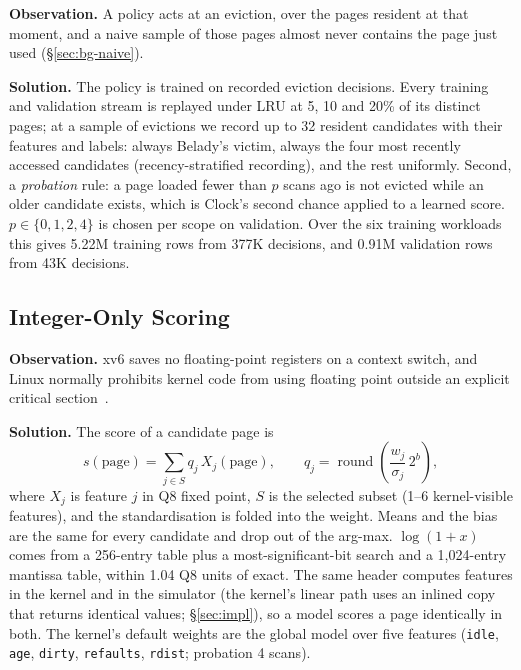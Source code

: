 \documentclass{article}
\newcommand{\clock}{Clock\xspace}
\newcommand{\belady}{Belady\xspace}
\newcommand{\feat}[1]{\texttt{#1}}         %
\newcommand{\finding}[1]{\textbf{#1}\hspace{0.4em}}
\begin{document}
\finding{Observation.} A policy acts at an eviction, over the pages resident at that
moment, and a naive sample of those pages almost never contains the page just used
(\S\ref{sec:bg-naive}).

\finding{Solution.} The policy is trained on recorded eviction decisions. Every training and
validation stream is replayed under LRU at 5, 10 and 20\% of its distinct pages; at a
sample of evictions we record up to 32 resident candidates with their features and
labels: always \belady's victim, always the four most recently accessed candidates
(recency-stratified recording), and the rest uniformly. Second, a \emph{probation} rule: a page loaded
fewer than $p$ scans ago is not evicted while an older candidate exists, which is
\clock's second chance applied to a learned score. $p\in\{0,1,2,4\}$ is chosen per
scope on validation. Over the six training workloads this gives 5.22M training rows
from 377K decisions, and 0.91M validation rows from 43K decisions.

\subsection{Integer-Only Scoring}
\label{sec:design-int}

\finding{Observation.} xv6 saves no floating-point registers on a context switch, and
Linux normally prohibits kernel code from using floating point outside an explicit
critical section~\citep{linux_fpu}.

\finding{Solution.} The score of a candidate page is
\begin{equation}
s(\text{page}) = \sum_{j\in S} q_j\, X_j(\text{page}), \qquad
q_j = \operatorname{round}\!\left(\frac{w_j}{\sigma_j}\, 2^{b}\right),
\label{eq:score}
\end{equation}
where $X_j$ is feature $j$ in Q8 fixed point, $S$ is the selected subset (1--6
kernel-visible features), and the standardisation is folded into the weight. Means and the bias are the
same for every candidate and drop out of the arg-max. $\log(1+x)$ comes from a 256-entry
table plus a most-significant-bit search and a 1,024-entry mantissa table, within 1.04
Q8 units of exact. The same header computes features in the kernel and in the
simulator (the kernel's linear path uses an inlined copy that returns identical values;
\S\ref{sec:impl}), so a model scores a page identically in both. The kernel's default weights
are the global model over five features (\feat{idle}, \feat{age}, \feat{dirty},
\feat{refaults}, \feat{rdist}; probation 4 scans).
\end{document}
